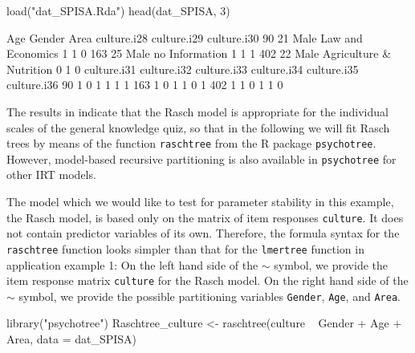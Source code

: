 \documentclass[doc,floatsintext,natbib]{apa7}
\begin{document}

\begin{Schunk}
\begin{Sinput}
 load("dat_SPISA.Rda")
 head(dat_SPISA, 3)
\end{Sinput}
\begin{Soutput}
    Age Gender                    Area culture.i28 culture.i29 culture.i30
90   21   Male       Law and Economics           1           1           0
163  25   Male          no Information           1           1           1
402  22   Male Agriculture & Nutrition           0           1           0
    culture.i31 culture.i32 culture.i33 culture.i34 culture.i35 culture.i36
90            1           0           1           1           1           1
163           1           0           1           1           0           1
402           1           1           0           1           1           0
\end{Soutput}
\end{Schunk}

The results in \citet{SPISA:book} indicate that the Rasch model is appropriate for the individual scales of the general knowledge quiz, so that in the following we will fit Rasch trees by means of the function \texttt{raschtree} from the R package \texttt{psychotree}. However, model-based recursive partitioning is also available in \texttt{psychotree} for other IRT models. 

The model which we would like to test for parameter stability in this example, the Rasch model, is based only on the matrix of item responses \texttt{culture}. It does not contain predictor variables of its own. Therefore, the formula syntax for the \texttt{raschtree} function looks simpler than that for the \texttt{lmertree} function in application example 1: On the left hand side of the $\sim$ symbol, we provide the item response matrix \texttt{culture} for the Rasch model. On the right hand side of the $\sim$ symbol, we provide the possible partitioning variables \texttt{Gender}, \texttt{Age}, and \texttt{Area}. 



\begin{Schunk}
\begin{Sinput}
 library("psychotree")
 Raschtree_culture <- raschtree(culture ~  Gender + Age + Area,
                                data = dat_SPISA)
\end{Sinput}
\end{Schunk}
\end{document}
